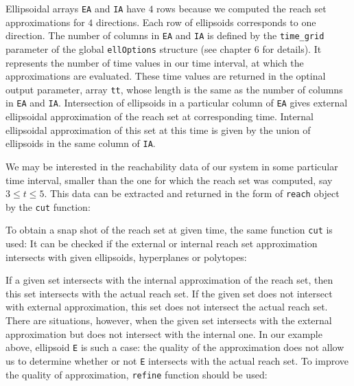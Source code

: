 \documentclass{report}
\begin{document}
Ellipsoidal arrays {\tt EA} and {\tt IA} have $4$ rows because we computed
the reach set approximations for $4$ directions. Each row of ellipsoids
corresponds to one direction. The number of columns in {\tt EA} and {\tt IA}
is defined by the {\tt time\_grid} parameter of the global {\tt ellOptions}
structure (see chapter 6 for details). It represents the number of time values
in our time interval, at which the approximations are evaluated. These
time values are returned in the optinal output parameter, array {\tt tt},
whose length is the same as the number of columns in {\tt EA} and {\tt IA}.
Intersection of ellipsoids in a particular column of {\tt EA} gives
external ellipsoidal approximation of the reach set at corresponding time.
Internal ellipsoidal approximation of this set at this time is given by the
union of ellipsoids in the same column of {\tt IA}.

We may be interested in the reachability data of our system in some
particular time interval, smaller than the one for which the reach set was
computed, say $3\leq t\leq5$.
This data can be extracted and returned in the form of {\tt reach}
object by the {\tt cut} function:

To obtain a snap shot of the reach set at given time, the same function
{\tt cut} is used:
It can be checked if the external or internal reach set approximation
intersects with given ellipsoids, hyperplanes or polytopes:




If a given set intersects with the internal approximation of the reach set,
then this set intersects with the actual reach set.
If the given set does not
intersect with external approximation, this set does not
intersect the actual reach set. There are situations, however, when the
given set intersects with the external approximation but does not intersect
with the internal one. In our example above, ellipsoid {\tt E} is such a case:
the quality of the approximation does not allow us to determine whether or not
{\tt E} intersects with the actual reach set. To improve the quality
of approximation, {\tt refine} function should be used:
\end{document}
